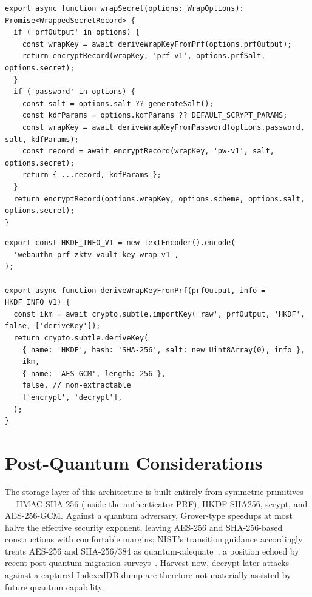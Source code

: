 \documentclass[runningheads]{llncs}
\begin{document}
\begin{lstlisting}[caption={\texttt{wrapSecret}: the three wrap paths (PRF, password, caller-supplied wrap key).}]
export async function wrapSecret(options: WrapOptions): Promise<WrappedSecretRecord> {
  if ('prfOutput' in options) {
    const wrapKey = await deriveWrapKeyFromPrf(options.prfOutput);
    return encryptRecord(wrapKey, 'prf-v1', options.prfSalt, options.secret);
  }
  if ('password' in options) {
    const salt = options.salt ?? generateSalt();
    const kdfParams = options.kdfParams ?? DEFAULT_SCRYPT_PARAMS;
    const wrapKey = await deriveWrapKeyFromPassword(options.password, salt, kdfParams);
    const record = await encryptRecord(wrapKey, 'pw-v1', salt, options.secret);
    return { ...record, kdfParams };
  }
  return encryptRecord(options.wrapKey, options.scheme, options.salt, options.secret);
}
\end{lstlisting}

\begin{lstlisting}[caption={HKDF derivation with the frozen v1 domain-separation label (\texttt{src/core/derive.ts}).}]
export const HKDF_INFO_V1 = new TextEncoder().encode(
  'webauthn-prf-zktv vault key wrap v1',
);

export async function deriveWrapKeyFromPrf(prfOutput, info = HKDF_INFO_V1) {
  const ikm = await crypto.subtle.importKey('raw', prfOutput, 'HKDF', false, ['deriveKey']);
  return crypto.subtle.deriveKey(
    { name: 'HKDF', hash: 'SHA-256', salt: new Uint8Array(0), info },
    ikm,
    { name: 'AES-GCM', length: 256 },
    false, // non-extractable
    ['encrypt', 'decrypt'],
  );
}
\end{lstlisting}

\section{Post-Quantum Considerations}
\label{sec:pq}
The storage layer of this architecture is built entirely from symmetric primitives --- HMAC-SHA-256 (inside the authenticator PRF), HKDF-SHA256, scrypt, and AES-256-GCM.
Against a quantum adversary, Grover-type speedups at most halve the effective security exponent, leaving AES-256 and SHA-256-based constructions with comfortable margins; NIST's transition guidance accordingly treats AES-256 and SHA-256/384 as quantum-adequate~\cite{nist-pqc}, a position echoed by recent post-quantum migration surveys~\cite{pq-cloud-survey}.
Harvest-now, decrypt-later attacks against a captured IndexedDB dump are therefore not materially assisted by future quantum capability.
\end{document}
